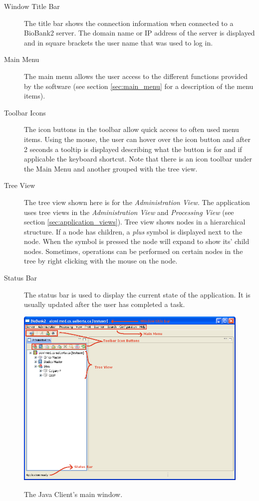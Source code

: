 \begin{description}
\item[Window Title Bar] The title bar shows the connection information when
  connected to a BioBank2 server. The domain name or IP address of the server
  is displayed and in square brackets the user name that was used to log in.
\item[Main Menu] The main menu allows the user access to the different
  functions provided by the software (see section \ref{sec:main_menu} for a
  description of the menu items).
\item[Toolbar Icons] The icon buttons in the toolbar allow quick access to
  often used menu items. Using the mouse, the user can hover over the icon
  button and after 2 seconds a tooltip is displayed describing what the
  button is for and if applicable the keyboard shortcut. Note that there is
  an icon toolbar under the Main Menu and another grouped with the tree view.
\item[Tree View] The tree view shown here is for the \emph{Administration
  View}. The application uses tree views in the \emph{Administration View}
  and \emph{Processing View} (see section \ref{sec:application_views}). Tree
  view shows nodes in a hierarchical structure. If a node has children, a
  \emph{plus} symbol is displayed next to the node. When the symbol is
  pressed the node will expand to show its' child nodes.  Sometimes,
  operations can be performed on certain nodes in the tree by right clicking
  with the mouse on the node.
\item[Status Bar] The status bar is used to display the current state of the
  application. It is usually updated after the user has completed a task.
\end{description}

\begin{figure}[h]
  \centering
  \scalebox{0.4}
	   { \includegraphics*{screenshots/overview/main_window} }
	   \caption{The Java Client's main window.}
	   \label{fig:main_window}
\end{figure}

